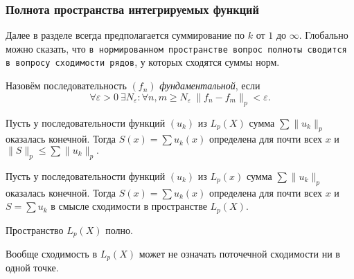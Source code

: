 
\subsubsection*{Полнота пространства интегрируемых функций}

Далее в разделе всегда предполагается суммирование по $k$ от $1$ до $\infty$. Глобально можно сказать, что \texttt{в нормированном пространстве вопрос полноты сводится в вопросу сходимости рядов}, у которых сходятся суммы норм. 

\begin{to_def}
    Назовём последовательность $(f_n)$ \textit{фундаментальной}, если
    \begin{equation*}
        \forall \varepsilon > 0 \ 
        \exists N_\varepsilon \colon 
        \forall n, m \geq N_\varepsilon \
        \|f_n - f_m\|_p < \varepsilon.
    \end{equation*}
\end{to_def}

\begin{to_lem}
    Пусть у последовательности функций $(u_k)$ из $L_p (X)$ сумма
    $\sum \|u_k\|_p$
    оказалась конечной. Тогда $S(x) = \sum u_k (x)$ определена для почти всех $x$ и
    $\|S\|_p \leq \sum \|u_k\|_p.$
\end{to_lem}


\begin{to_lem}
    Пусть у последовательности функций $(u_k)$ из $L_p (x)$ сумма
    $\sum \|u_k\|_p$
    оказалась конечной. Тогда $S(x) = \sum u_k (x)$ определена для почти всех $x$ и
    $S = \sum u_k$
    в смысле сходимости в пространстве $L_p (X)$.
\end{to_lem}


\begin{to_thr}[]
    Пространство $L_p (X)$ полно.
\end{to_thr}



Вообще сходимость в $L_p (X)$ может не означать поточечной сходимости ни в одной точке.